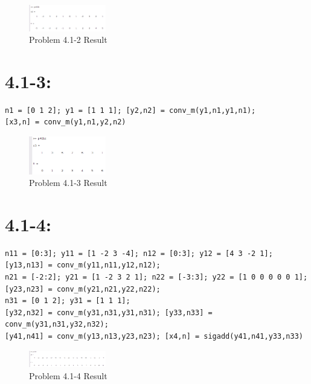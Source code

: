 \documentclass[11pt
  , a4paper
  , article
  , oneside
]{memoir}
\begin{document}
\begin{figure}[h!]
	\centering
	\includegraphics[width=0.3\textwidth,height=0.15\textwidth]{./images/p401-2.png}
	\caption{Problem 4.1-2 Result}
	\label{fig:Problem 4.1-2 Result}
\end{figure}

\section{4.1-3: }
\begin{lstlisting}[style=termstyle]
n1 = [0 1 2]; y1 = [1 1 1]; [y2,n2] = conv_m(y1,n1,y1,n1);
[x3,n] = conv_m(y1,n1,y2,n2)
\end{lstlisting}

\begin{figure}[h!]
	\centering
	\includegraphics[width=0.3\textwidth,height=0.15\textwidth]{./images/p401-3.png}
	\caption{Problem 4.1-3 Result}
	\label{fig:Problem 4.1-3 Result}
\end{figure}
\clearpage
\section{4.1-4: }
\begin{lstlisting}[style=termstyle]
n11 = [0:3]; y11 = [1 -2 3 -4]; n12 = [0:3]; y12 = [4 3 -2 1];
[y13,n13] = conv_m(y11,n11,y12,n12);
n21 = [-2:2]; y21 = [1 -2 3 2 1]; n22 = [-3:3]; y22 = [1 0 0 0 0 0 1];
[y23,n23] = conv_m(y21,n21,y22,n22);
n31 = [0 1 2]; y31 = [1 1 1];
[y32,n32] = conv_m(y31,n31,y31,n31); [y33,n33] = conv_m(y31,n31,y32,n32);
[y41,n41] = conv_m(y13,n13,y23,n23); [x4,n] = sigadd(y41,n41,y33,n33)
\end{lstlisting}

\begin{figure}[h!]
	\centering
	\includegraphics[width=0.3\textwidth,height=0.15\textwidth]{./images/p401-4.png}
	\caption{Problem 4.1-4 Result}
	\label{fig:Problem 4.1-4 Result}
\end{figure}
\end{document}
